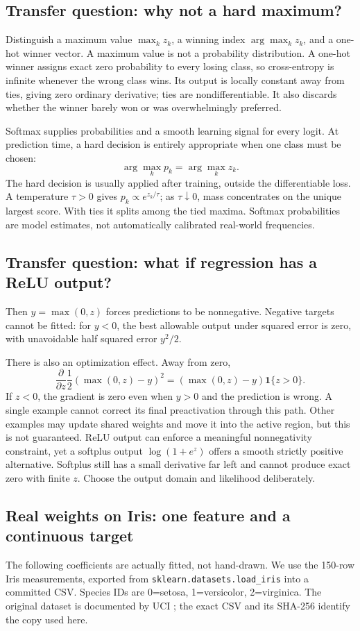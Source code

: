\subsection{Transfer question: why not a hard maximum?}
Distinguish a maximum value $\max_k z_k$, a winning index $\arg\max_kz_k$, and a one-hot winner vector. A maximum value is not a probability distribution. A one-hot winner assigns exact zero probability to every losing class, so cross-entropy is infinite whenever the wrong class wins. Its output is locally constant away from ties, giving zero ordinary derivative; ties are nondifferentiable. It also discards whether the winner barely won or was overwhelmingly preferred.

Softmax supplies probabilities and a smooth learning signal for every logit. At prediction time, a hard decision is entirely appropriate when one class must be chosen:
\[
 \arg\max_k p_k=\arg\max_k z_k.
\]
The hard decision is usually applied after training, outside the differentiable loss. A temperature $\tau>0$ gives $p_k\propto e^{z_k/\tau}$; as $\tau\downarrow0$, mass concentrates on the unique largest score. With ties it splits among the tied maxima. Softmax probabilities are model estimates, not automatically calibrated real-world frequencies.

\subsection{Transfer question: what if regression has a ReLU output?}
Then $\hat y=\max(0,z)$ forces predictions to be nonnegative. Negative targets cannot be fitted: for $y<0$, the best allowable output under squared error is zero, with unavoidable half squared error $y^2/2$.

There is also an optimization effect. Away from zero,
\[
 \frac{\partial}{\partial z}\frac12(\max(0,z)-y)^2
 =(\max(0,z)-y)\mathbf1\{z>0\}.
\]
If $z<0$, the gradient is zero even when $y>0$ and the prediction is wrong. A single example cannot correct its final preactivation through this path. Other examples may update shared weights and move it into the active region, but this is not guaranteed. ReLU output can enforce a meaningful nonnegativity constraint, yet a softplus output $\log(1+e^z)$ offers a smooth strictly positive alternative. Softplus still has a small derivative far left and cannot produce exact zero with finite $z$. Choose the output domain and likelihood deliberately.

\subsection{Real weights on Iris: one feature and a continuous target}
The following coefficients are actually fitted, not hand-drawn. We use the 150-row Iris measurements, exported from \texttt{sklearn.datasets.load\_iris} into a committed CSV. Species IDs are 0=setosa, 1=versicolor, 2=virginica. The original dataset is documented by UCI \citep{irisuci}; the exact CSV and its SHA-256 identify the copy used here.

